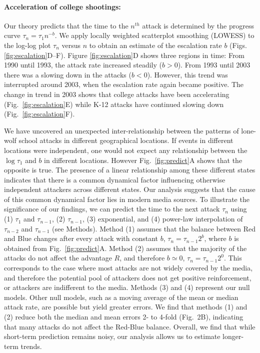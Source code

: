 \paragraph*{Acceleration of college shootings:}
Our theory predicts that the time to the $n^{th}$ attack is determined
by the progress curve $\tau_n = \tau_1 n^{-b}$. We apply locally
weighted scatterplot smoothing (LOWESS) to the log-log plot $\tau_n$
versus $n$ to obtain an estimate of the escalation rate $b$
(Figs. \ref{fig:escalation}D--F). Figure \ref{fig:escalation}D shows
three regions in time: From 1990 until 1993, the attack rate increased
steadily ($b>0$). From 1993 until 2003 there was a slowing down in the
attacks ($b<0$). However, this trend was interrupted around 2003, when
the escalation rate again became positive. The change in trend in 2003
shows that college attacks have been accelerating
(Fig.~\ref{fig:escalation}E) while K-12 attacks have continued slowing
down (Fig.~\ref{fig:escalation}F). 

We have uncovered an unexpected inter-relationship between the
patterns of lone-wolf school attacks in different geographical
locations. If events in different locations were independent, one
would not expect any relationship between the $\log{\tau_1}$ and $b$
in different locations. 
However Fig.~\ref{fig:predict}A shows that the opposite is
true. The presence of a linear relationship among these different
states indicates that there is a common dynamical factor influencing
otherwise independent attackers across different states. Our analysis
suggests that the cause of this common dynamical factor lies in modern
media sources. To illustrate the significance of our findings, we can
predict the time to the next attack $\tau_n$ using
(1) $\tau_1$ and $\tau_{n-1}$, 
(2) $\tau_{n-1}$, 
(3) exponential, and 
(4) power-law interpolation of $\tau_{n-2}$ and $\tau_{n-1}$ (see Methods). 
Method (1) assumes that the balance between Red and Blue changes after
every attack with constant $b$, $\tau_n = \tau_{n-1} 2^{b}$, where $b$
is obtained from Fig.~\ref{fig:predict}A. Method (2) assumes that the
majority of the attacks do not affect the advantage $R$, and therefore
$b \simeq 0$, $\tau_n = \tau_{n-1} 2^{0}$. 
This corresponds to the case where most attacks are not widely covered
by the media, and therefore the potential pool of attackers does not
get positive reinforcement, or attackers are indifferent to the media.
Methods (3) and (4) represent our null models. Other null models, such
as a moving average of the mean or median attack rate, are possible
but yield greater errors. 
We find that methods (1) and (2) reduce both the median and mean
errors 2- to 4-fold (Fig.~2B), indicating that many attacks do not
affect the Red-Blue balance. Overall, we find that while short-term
prediction remains noisy, our analysis allows us to estimate
longer-term trends. 


